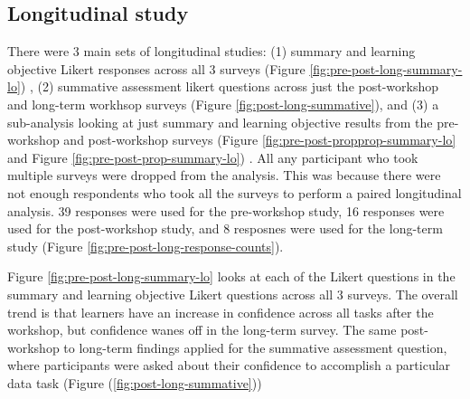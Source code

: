 \documentclass[030-workshop.tex]{subfiles}
\begin{document}
    \subsection{Longitudinal study}

        There were 3 main sets of longitudinal studies:
        (1) summary and learning objective Likert responses across all 3 surveys
        (Figure \ref{fig:pre-post-long-summary-lo})
        ,
        (2) summative assessment likert questions across just the post-workshop and long-term workhsop surveys
        (Figure \ref{fig:post-long-summative}), and
        (3) a sub-analysis looking at just summary and learning objective results from the pre-workshop and post-workshop surveys
        (Figure \ref{fig:pre-post-propprop-summary-lo} and Figure \ref{fig:pre-post-prop-summary-lo})
        .
        All any participant who took multiple surveys were dropped from the analysis.
        This was because there were not enough respondents who took all the surveys to perform a paired longitudinal analysis.
        39 responses were used for the pre-workshop study,
        16 responses were used for the post-workshop study, and
        8 resposnes were used for the long-term study (Figure \ref{fig:pre-post-long-response-counts}).

        Figure \ref{fig:pre-post-long-summary-lo} looks at each of the Likert questions in the
        summary and learning objective Likert questions across all 3 surveys.
        The overall trend is that learners have an increase in confidence across all tasks after the workshop,
        but confidence wanes off in the long-term survey.
        The same post-workshop to long-term findings applied for the summative assessment question,
        where participants were asked about their confidence to accomplish a particular data task
        (Figure (\ref{fig:post-long-summative}))
\end{document}
